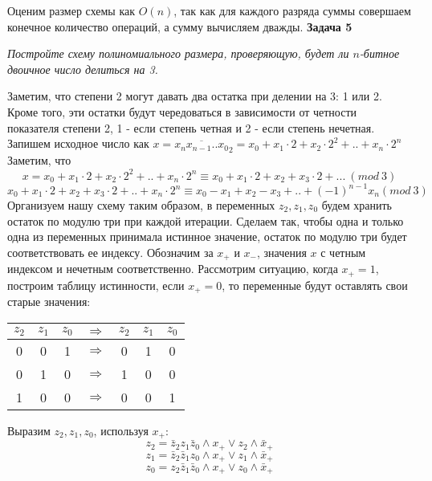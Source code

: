 \documentclass{article}
\begin{document}
Оценим размер схемы как $O(n)$, так как для каждого разряда суммы совершаем конечное количество операций, а сумму вычисляем дважды.
\newline \newline
 \noindent \textbf{Задача 5}
\begin{center}
\textit{Постройте схему полиномиального размера, проверяющую, будет ли $n$-битное двоичное число делиться на 3.} 
\end{center}
Заметим, что степени 2 могут давать два остатка при делении на 3: 1 или 2. Кроме того, эти остатки будут чередоваться в зависимости от четности показателя степени 2, 1 - если степень четная и 2 - если степень нечетная. Запишем исходное число как $x=\overline{x_n x_{n-1}..x_0}_2=x_0 + x_1 \cdot 2 + x_2 \cdot 2^2+..+x_n \cdot 2^n $
Заметим, что
$$x = x_0 + x_1 \cdot 2 + x_2 \cdot 2^2+..+x_n \cdot 2^n \equiv x_0 + x_1 \cdot 2 + x_2+ x_3\cdot 2+...~ (mod ~3)$$
$$x_0 + x_1 \cdot 2 + x_2+ x_3\cdot 2+..+x_n \cdot 2^{n} \equiv x_0 - x_1 + x_2 - x_3+..+(-1)^{n-1}x_n(mod ~3)$$
Организуем нашу схему таким образом, в переменных $z_2, z_1, z_0$ будем хранить остаток по модулю три при каждой итерации. Сделаем так, чтобы одна и только одна из переменных принимала истинное значение, остаток по модулю три будет соответствовать ее индексу. Обозначим за $x_+$ и $x_-$, значения $x$ с четным индексом и нечетным соответственно.
Рассмотрим ситуацию, когда $x_+=1$, построим таблицу истинности, если $x_+=0$, то переменные будут оставлять свои старые значения:
\begin{center}
\begin{tabular}{|c|c|c|c|c|c|c|}
\hline
$z_2$ & $z_1$ & $z_0$ & $\Rightarrow$ & $z_2$ & $z_1$ & $z_0$   \\
\hline
0 & 0 & 1 & $\Rightarrow$  & 0 & 1 & 0 \\
\hline
0 & 1 & 0 & $\Rightarrow$  & 1 & 0 & 0 \\
\hline
1 & 0 & 0 & $\Rightarrow$  & 0 & 0 & 1 \\
\hline
\end{tabular}
\end{center}
Выразим $z_2, z_1, z_0$, используя $x_+$:
$$z_2 = \bar{z}_2 z_1 \bar{z}_0 \wedge x_+ \vee z_2 \wedge \bar{x}_+$$
$$z_1 = \bar{z}_2 \bar{z}_1 z_0 \wedge x_+ \vee z_1 \wedge \bar{x}_+$$
$$z_0 = z_2 \bar{z}_1 \bar{z}_0 \wedge x_+ \vee z_0 \wedge \bar{x}_+$$
\end{document}
